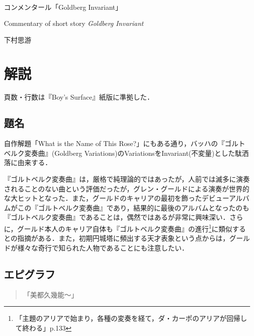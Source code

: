 \documentclass[10pt, a5paper, twoside]{ltjsarticle}
\begin{document}
	~ %

	\begin{center}

		\Large{コンメンタール「Goldberg Invariant」}

		\vspace{3mm}

		\large{Commentary of short story \textit{Goldberg Invariant}}

		\vspace{3mm}

		\large{下村思游}

	\end{center}

	\vspace{3mm}

	\section{解説}

        頁数・行数は『Boy's Surface』紙版\cite{boys}に準拠した．

        \subsection{題名}

            自作解題「What is the Name of This Rose?」にもある通り，バッハの『ゴルトベルク変奏曲』(Goldberg Variations)のVariationsをInvariant(不変量)とした駄洒落に由来する．

            『ゴルトベルク変奏曲』は，厳格で純理論的ではあったが，人前では滅多に演奏されることのない曲という評価だった\cite{gould}が，グレン・グールドによる演奏が世界的な大ヒットとなった．また，グールドのキャリアの最初を飾ったデビューアルバムがこの『ゴルトベルク変奏曲』であり，結果的に最後のアルバムとなったのも『ゴルトベルク変奏曲』であることは，偶然ではあるが非常に興味深い．さらに，グールド本人のキャリア自体も『ゴルトベルク変奏曲』の進行\footnote{「主題のアリアで始まり，各種の変奏を経て，ダ・カーポのアリアが回帰して終わる」\cite{miyazawa}p.133}に類似するとの指摘がある\cite{miyazawa}．また，初期円城塔に頻出する天才表象という点からは，グールドが様々な奇行で知られた人物であることにも注意したい．

        \subsection{エピグラフ}

            \begin{quote}
                「美都久幾能〜」
            \end{quote}
\end{document}
